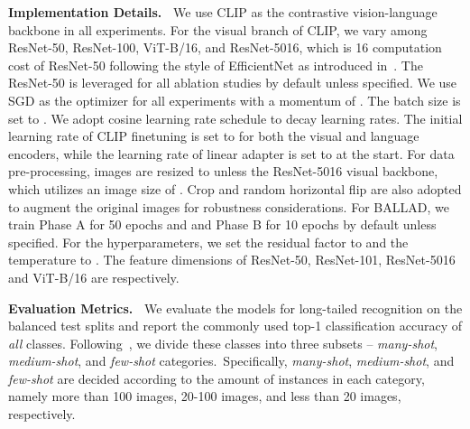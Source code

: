 \documentclass[10pt,twocolumn,letterpaper]{article}
\newcommand{\approach}{\textsc{BALLAD}}
\begin{document}
\noindent\textbf{Implementation Details.~}
We use CLIP as the contrastive vision-language backbone in all experiments. For the visual branch of CLIP, we vary among ResNet-50, ResNet-100, ViT-B/16, and ResNet-5016, which is 16 computation cost of ResNet-50 following the style of EfficientNet as introduced in~\cite{radford2021learning}. The ResNet-50 is leveraged for all ablation studies by default unless specified. We use SGD as the optimizer for all experiments with a momentum of . The batch size is set to . We adopt cosine learning rate schedule to decay learning rates. The initial learning rate of CLIP finetuning is set to 
for both the visual and language encoders, while the learning rate of linear adapter is set to  at the start. For data pre-processing, images are resized to  unless the ResNet-5016 visual backbone, which utilizes an image size of . Crop and random horizontal flip are also adopted to augment the original images for robustness considerations. For \approach{}, we train Phase A for 50 epochs and and Phase B for 10 epochs by default unless specified. For the hyperparameters, we set the residual factor  to  and the temperature  to . The feature dimensions of ResNet-50, ResNet-101, ResNet-5016 and ViT-B/16 are  respectively.


\noindent\textbf{Evaluation Metrics.~}
We evaluate the models for long-tailed recognition on the balanced test splits and report the commonly used top-1 classification accuracy of \textit{all} classes. Following~\cite{Kang2020Decoupling}, we divide these classes into three subsets -- \textit{many-shot}, \textit{medium-shot}, and \textit{few-shot} categories.~Specifically, \textit{many-shot}, \textit{medium-shot}, and \textit{few-shot} are decided according to the amount of instances in each category, namely more than 100 images, 20-100 images, and less than 20 images, respectively.
\end{document}
